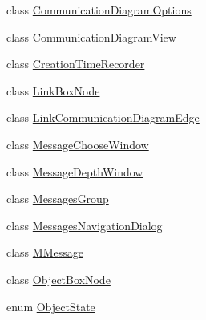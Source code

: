 \begin{DoxyCompactItemize}
\item 
class \hyperlink{classorg_1_1tzi_1_1use_1_1gui_1_1views_1_1diagrams_1_1behavior_1_1communicationdiagram_1_1_communication_diagram_options}{Communication\-Diagram\-Options}
\item 
class \hyperlink{classorg_1_1tzi_1_1use_1_1gui_1_1views_1_1diagrams_1_1behavior_1_1communicationdiagram_1_1_communication_diagram_view}{Communication\-Diagram\-View}
\item 
class \hyperlink{classorg_1_1tzi_1_1use_1_1gui_1_1views_1_1diagrams_1_1behavior_1_1communicationdiagram_1_1_creation_time_recorder}{Creation\-Time\-Recorder}
\item 
class \hyperlink{classorg_1_1tzi_1_1use_1_1gui_1_1views_1_1diagrams_1_1behavior_1_1communicationdiagram_1_1_link_box_node}{Link\-Box\-Node}
\item 
class \hyperlink{classorg_1_1tzi_1_1use_1_1gui_1_1views_1_1diagrams_1_1behavior_1_1communicationdiagram_1_1_link_communication_diagram_edge}{Link\-Communication\-Diagram\-Edge}
\item 
class \hyperlink{classorg_1_1tzi_1_1use_1_1gui_1_1views_1_1diagrams_1_1behavior_1_1communicationdiagram_1_1_message_choose_window}{Message\-Choose\-Window}
\item 
class \hyperlink{classorg_1_1tzi_1_1use_1_1gui_1_1views_1_1diagrams_1_1behavior_1_1communicationdiagram_1_1_message_depth_window}{Message\-Depth\-Window}
\item 
class \hyperlink{classorg_1_1tzi_1_1use_1_1gui_1_1views_1_1diagrams_1_1behavior_1_1communicationdiagram_1_1_messages_group}{Messages\-Group}
\item 
class \hyperlink{classorg_1_1tzi_1_1use_1_1gui_1_1views_1_1diagrams_1_1behavior_1_1communicationdiagram_1_1_messages_navigation_dialog}{Messages\-Navigation\-Dialog}
\item 
class \hyperlink{classorg_1_1tzi_1_1use_1_1gui_1_1views_1_1diagrams_1_1behavior_1_1communicationdiagram_1_1_m_message}{M\-Message}
\item 
class \hyperlink{classorg_1_1tzi_1_1use_1_1gui_1_1views_1_1diagrams_1_1behavior_1_1communicationdiagram_1_1_object_box_node}{Object\-Box\-Node}
\item 
enum \hyperlink{enumorg_1_1tzi_1_1use_1_1gui_1_1views_1_1diagrams_1_1behavior_1_1communicationdiagram_1_1_object_state}{Object\-State}
\end{DoxyCompactItemize}
